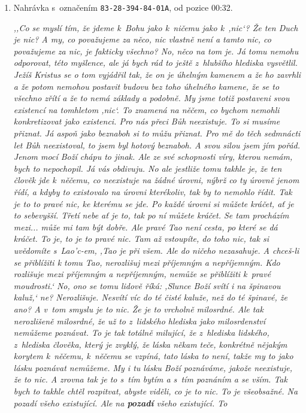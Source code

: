 \begin{enumerate}
{}

\item{%
Nahrávka s~označením \texttt{83-28-394-84-01A}, od pozice 00:32.

\textit{%
,,Co se myslí tím, že jdeme k~Bohu jako k~ničemu jako k~,nic`? Že ten Duch je
nic? A my, co považujeme za něco, nic vlastně není a tamto nic, co považujeme
za nic, je fakticky všechno? No, něco na tom je. Já tomu nemohu odporovat, této
myšlence, ale já bych rád to ještě z~hlubšího hlediska vysvětlil. Ježíš Kristus
se o tom vyjádřil tak, že on je úhelným kamenem a že ho zavrhli a že potom
nemohou postavit budovu bez toho úhelného kamene, že se to všechno zřítí a že to
nemá základy a podobně. My jsme totiž postaveni svou existencí na tomhletom
,nic`. To znamená na něčem, co bychom nemohli konkretizovat jako existenci. Pro
nás přeci Bůh neexistuje. To si musíme přiznat. Já aspoň jako beznaboh si to
můžu přiznat. Pro mě do těch sedmnácti let Bůh neexistoval, to jsem byl hotový
beznaboh. A svou silou jsem jím pořád. Jenom mocí Boží chápu to jinak. Ale ze
své schopnosti víry, kterou nemám, bych to nepochopil. Já vás obdivuju. No ale
jestliže tomu takhle je, že ten člověk jde k~něčemu, co neexistuje na žádné
úrovni, nýbrž co ty úrovně jenom řídí, a kdyby to existovalo na úrovni
kterékoliv, tak by to nemohlo řídit. Tak je to to pravé nic, ke kterému se jde.
Po každé úrovni si můžete kráčet, ať je to sebevyšší. Třetí nebe ať je to, tak
po ní můžete kráčet. Se tam procházím mezi... může mi tam být dobře. Ale pravé
Tao není cesta, po které se dá kráčet. To je, to je to pravé nic. Tam až
vstoupíte, do toho nic, tak si uvědomíte s~Lao'c-em, ,Tao je při všem. Ale do
ničeho nezasahuje. A chceš-li se přiblížiti k tomu Tao, nerozlišuj mezi
příjemným a nepříjemným. Kdo rozlišuje mezi příjemným a nepříjemným, nemůže se
přiblížiti k~pravé moudrosti.` No, ono se tomu lidově říká: ,Slunce Boží svítí i na
špinavou kaluž,` ne? Nerozlišuje. Nesvítí víc do té
čisté kaluže, než do té špinavé, že ano? A v~tom smyslu je to nic. Že je to
vrcholně milosrdné. Ale tak nerozlišeně milosrdné, že už to z~lidského hlediska
jako milosrdenství nemůžeme poznávat. To je tak totálně milující, že z~hlediska
lidského, z~hlediska člověka, který je zvyklý, že láska někam teče, konkrétně
nějakým korytem k~něčemu, k~něčemu se vzpíná, tato láska to není, takže my to
jako lásku poznávat nemůžeme. My i tu lásku Boží poznáváme, jakože neexistuje,
že to nic. A zrovna tak je to s~tím bytím a s~tím poznáním a se vším. Tak bych
to takhle chtěl rozpitvat, abyste viděli, co je to nic. To je všeobsažné.
Na pozadí všeho existující. Ale na \textbf{pozadí} všeho existující. To
}}
\end{enumerate}
